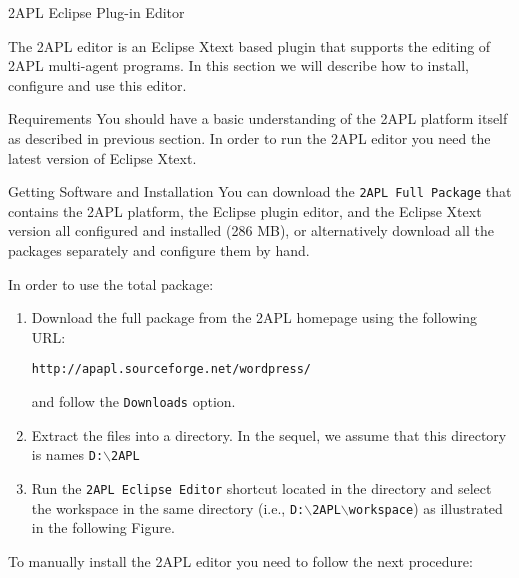 \begin{section}{2APL Eclipse Plug-in Editor} \label{chap:eclipse}

The 2APL editor is an Eclipse Xtext based plugin that supports the
editing of 2APL multi-agent programs. In this section we will
describe how to install, configure and use this editor.

\begin{section}{Requirements}
You should have a basic understanding of the 2APL platform itself as
described in previous section. In order to run the 2APL editor you
need the latest version of Eclipse Xtext.
\end{section}

\begin{section}{Getting Software and Installation}
You can download the {\tt 2APL Full Package} that contains the 2APL
platform, the Eclipse plug\-in editor, and the Eclipse Xtext version
all configured and installed (286 MB), or alternatively download all
the packages separately and configure them by hand.

In order to use the total package:
\begin{enumerate}

    \item Download the full package from the 2APL homepage using the
    following URL:
    \begin{center}
    {\tt http://apapl.sourceforge.net/wordpress/}
    \end{center}
    and follow the {\tt Downloads} option.

    \item Extract the files into a directory. In the sequel, we assume that this directory is names \texttt{D:$\backslash$2APL}

    \item Run the \texttt{2APL Eclipse Editor} shortcut located in the
    directory and select the workspace in the same directory (i.e.,
    \texttt{D:$\backslash$2APL$\backslash$workspace}) as illustrated in the following
    Figure.
        \begin{figure}[ht]
            \begin{center}
            \end{center}\label{fig:workspace}
        \end{figure}
\end{enumerate}

To manually install the 2APL editor you need to follow the next
procedure:


\end{section}
\end{section}
